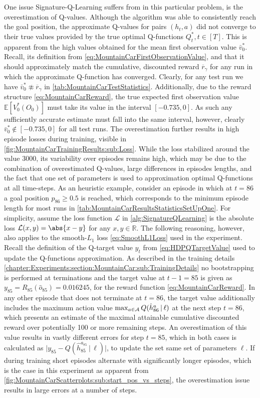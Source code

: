 \documentclass[
    a4paper,
    11pt,
    bibliography=totoc,
    listof=totoc,      
    headinclude=true,
    cleardoublepage=empty,
]{scrbook}
\theoremstyle{plain}
\theoremstyle{definition}
\theoremstyle{remark}
\newcommand{\SetR}{\mathbb R}
\newcommand{\E}{\mathbb E}
\newcommand{\SpaceA}{{\cal A}}
\begin{document}
One issue Signature-Q-Learning suffers from in this particular problem, is
the overestimation of Q-values. Although the algorithm was able to consistently
reach the goal position, the approximate Q-values for pairs $(h_t,a)$ did not
converge to their true values provided by the true optimal Q-functions $Q_t^*,
t\in[T]$. This is apparent from the high values obtained for the mean first 
observation value $\bar v_0^*$. Recall, its definition from 
\cref{eq:MountainCarFirstObservationValue}, and that it should approximately
match the cumulative, discounted reward $\overline r_\gamma$ for
any run in 
which the approximate Q-function has converged. Clearly, for any test run we 
have $\bar v_0^* \not\approx \overline r_\gamma$ in
\cref{tab:MountainCarTestStatistics}. Additionally, due to the reward
structure \eqref{eq:MountainCarReward}, the true expected first observation
value $\E[V_0^*(O_0)]$ must take its value in the interval $[-0.735, 0]$. As 
such any sufficiently accurate estimate must fall into the same interval, 
however, clearly $\bar v_0^* \notin [-0.735, 0]$ for all test runs. The 
overestimation further  results in high episode losses during training, 
visible in \cref{fig:MountainCarTrainingResults:sub:Loss}. While the loss
stabilized around the value 3000, its variability over episodes remains high,
which may be due to the combination of overestimated Q-values, large
differences in episodes lengths, and the fact that one set of parameters is
used to approximation optimal Q-functions at all time-steps. As an heuristic
example, consider an episode in which at $t=86$ a goal position
$p_{86}\geq 0.5$ is reached, which corresponds to the minimum episode
length for most runs in \cref{tab:MountainCarResultsStatisticsSetUpOne}. For
simplicity, assume the loss function $\mathcal{L}$ in 
\cref{alg:SignatureQLearning} is the absolute loss $\mathcal{L}(x,y) = 
\abs{x-y}$ for any $x,y\in\SetR$. The following reasoning, however, also 
applies to the smooth-$L_1$ loss \eqref{eq:SmoothL1Loss} used in the 
experiment. Recall the definition of the Q-target value $y_t$ from 
\cref{eq:HDPQTargetValue} used to update the Q-functions approximation. As 
described in the training details 
\cref{chapter:Experiments:section:MountainCar:sub:TrainingDetails}
no bootstrapping is performed at terminations and the target value at $t-1=85$
is given as $y_{85} = R_{85}(\hat{o}_{85})=0.016245$, for the reward function
\eqref{eq:MountainCarReward}. In any other episode that does not terminate at
$t=86$, the target value additionally includes the maximum action value 
$\max_{a\in\SpaceA} Q(\hat{h}_{86}^a\,|\,\ell)$ at the next step $t=86$, which
presents an estimate of the maximal attainable cumulative discounted reward
over potentially 100 or more remaining steps. An overestimation of this value
results in vastly different errors for step $t=85$, which in both cases is
calculated as $\bigl| y_{85} - Q(\hat{h}_{85}^{a_{85}}\,|\,\ell) \bigr|$, to
update the set same set of parameters $\ell$. If during training short
episodes alternate with significantly longer episodes, which is the case in
this experiment as apparent from
\cref{fig:MountainCarScatterplots:sub:start_pos_vs_steps}, the overestimation
issue results in large errors at a number of steps.
\end{document}

